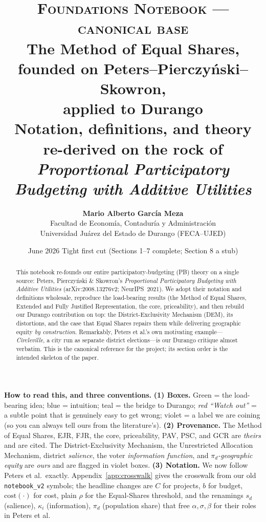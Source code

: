 \documentclass[11pt,letterpaper]{article}
\title{%
  \vspace{-0.8cm}
  {\large\scshape Foundations Notebook --- canonical base}\\[0.6em]
  {\LARGE\bfseries The Method of Equal Shares,\\[0.2em] founded on Peters--Pierczy\'nski--Skowron,\\[0.2em] applied to Durango}\\[0.5em]
  {\large Notation, definitions, and theory re-derived on the rock of\\[0.2em]
  \emph{Proportional Participatory Budgeting with Additive Utilities}}
}
\author{\textbf{Mario Alberto Garc\'ia Meza}\\[2pt]
  \small Facultad de Econom\'ia, Contadur\'ia y Administraci\'on\\
  \small Universidad Ju\'arez del Estado de Durango (FECA--UJED)}
\date{June 2026 \;\textbullet\; Tight first cut (Sections 1--7 complete; Section 8 a stub)}
\theoremstyle{definition}
\theoremstyle{plain}
\theoremstyle{remark}
\newcommand{\projects}{C}          %
\newcommand{\budget}{b}            %
\newcommand{\cost}{\mathrm{cost}}  %
\newcommand{\popshare}{\pi}        %
\begin{document}
\maketitle
\thispagestyle{fancy}

\begin{abstract}
\noindent This notebook re-founds our entire participatory-budgeting (PB) theory on a single
source: Peters, Pierczy\'nski \& Skowron's \emph{Proportional Participatory Budgeting with
Additive Utilities} (arXiv:2008.13276v2; NeurIPS~2021). We adopt their notation and definitions
wholesale, reproduce the load-bearing results (the Method of Equal Shares, Extended and Fully
Justified Representation, the core, priceability), and then rebuild our Durango contribution on
top: the District-Exclusivity Mechanism (DEM), its distortions, and the case that Equal Shares
repairs them while delivering geographic equity \emph{by construction}. Remarkably, Peters et
al.'s own motivating example---\emph{Circleville}, a city run as separate district elections---is
our Durango critique almost verbatim. This is the canonical reference for the project; its section
order is the intended skeleton of the paper.
\end{abstract}

\begin{aside}
\small\textbf{How to read this, and three conventions.}
\textbf{(1) Boxes.} Green = the load-bearing idea; blue = intuition; teal = the bridge to Durango;
\emph{red ``Watch out''} = a subtle point that is genuinely easy to get wrong; violet = a label we
are coining (so you can always tell ours from the literature's).
\textbf{(2) Provenance.} The Method of Equal Shares, EJR, FJR, the core, priceability, PAV, PSC,
and GCR are \emph{theirs} and are cited. The District-Exclusivity Mechanism, the Unrestricted
Allocation Mechanism, district \emph{salience}, the voter \emph{information function}, and
\emph{$\popshare_d$-geographic equity} are \emph{ours} and are flagged in violet boxes.
\textbf{(3) Notation.} We now follow Peters et al.\ exactly. Appendix~\ref{app:crosswalk} gives the
crosswalk from our old \texttt{notebook\_v2} symbols; the headline changes are
$\projects$ for projects, $\budget$ for budget, $\cost(\cdot)$ for cost, plain $\rho$ for the
Equal-Shares threshold, and the renamings $s_d$ (salience), $\kappa_i$ (information), $\pi_d$
(population share) that free $\alpha,\sigma,\beta$ for their roles in Peters et al.
\end{aside}

\tableofcontents
\newpage
\end{document}

